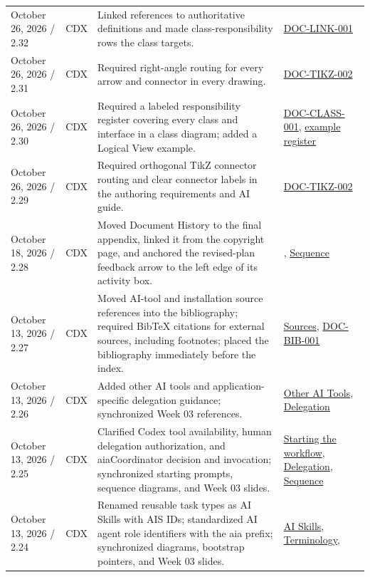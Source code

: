 \begin{tabularx}{\linewidth}{L{3.1cm}L{2.2cm}YL{2.0cm}}
October 26, 2026 / 2.32 & CDX & Linked references to authoritative definitions and made class-responsibility rows the class targets. & \hyperref[Requirement:DOCLINK001]{DOC-LINK-001}\\
October 26, 2026 / 2.31 & CDX & Required right-angle routing for every arrow and connector in every drawing. & \hyperref[Requirement:DOCTIKZ002]{DOC-TIKZ-002}\\
October 26, 2026 / 2.30 & CDX & Required a labeled responsibility register covering every class and interface in a class diagram; added a Logical View example. & \hyperref[Requirement:DOCCLASS001]{DOC-CLASS-001}, \hyperref[Table:ExampleClassResponsibilities]{example register}\\
October 26, 2026 / 2.29 & CDX & Required orthogonal TikZ connector routing and clear connector labels in the authoring requirements and AI guide. & \hyperref[Requirement:DOCTIKZ002]{DOC-TIKZ-002}\\
October 18, 2026 / 2.28 & CDX & Moved Document History to the final appendix, linked it from the copyright page, and anchored the revised-plan feedback arrow to the left edge of its activity box. & , \hyperref[Figure:AIImplementationSequence]{Sequence}\\
October 13, 2026 / 2.27 & CDX & Moved AI-tool and installation source references into the bibliography; required BibTeX citations for external sources, including footnotes; placed the bibliography immediately before the index. & \hyperref[Section:DocumentBibliography]{Sources}, \hyperref[Requirement:DOCBIB001]{DOC-BIB-001}\\
October 13, 2026 / 2.26 & CDX & Added other AI tools and application-specific delegation guidance; synchronized Week 03 references. & \hyperref[Section:AIOtherTools]{Other AI Tools}, \hyperref[Section:AIAgentDelegation]{Delegation}\\
October 13, 2026 / 2.25 & CDX & Clarified Codex tool availability, human delegation authorization, and aiaCoordinator decision and invocation; synchronized starting prompts, sequence diagrams, and Week 03 slides. & \hyperref[Section:AIImplementationStart]{Starting the workflow}, \hyperref[Section:AIAgentDelegation]{Delegation}, \hyperref[Figure:AIImplementationSequence]{Sequence}\\
October 13, 2026 / 2.24 & CDX & Renamed reusable task types as AI Skills with AIS IDs; standardized AI agent role identifiers with the aia prefix; synchronized diagrams, bootstrap pointers, and Week 03 slides. & \hyperref[Table:AISkills]{AI Skills}, \hyperref[Rule:AITerminologyConsistency]{Terminology}, \\

\end{tabularx}
